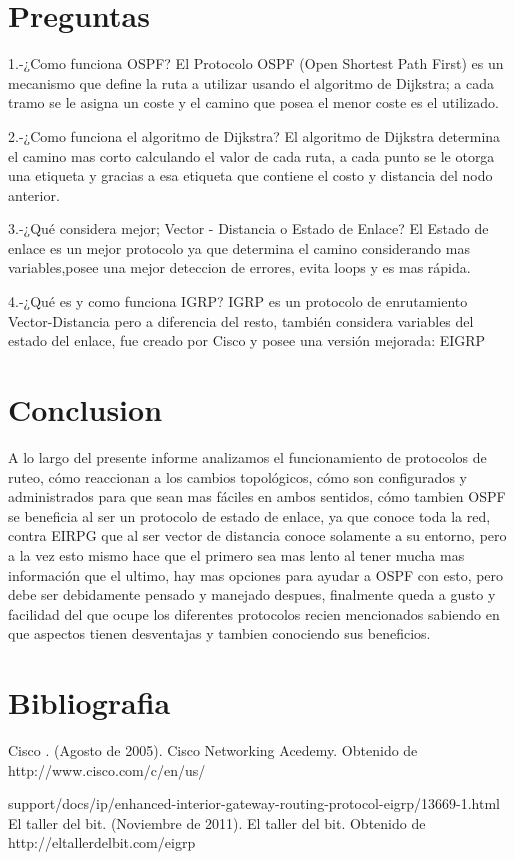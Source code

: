 \documentclass{article}
\begin{document}
\newpage

\section{Preguntas}
1.-¿Como funciona OSPF?
El Protocolo OSPF (Open Shortest Path First) es un mecanismo que define la ruta a utilizar  usando el algoritmo de Dijkstra; a cada tramo se le asigna un coste y el camino que posea el menor coste es el utilizado.

2.-¿Como funciona el algoritmo de Dijkstra?
El algoritmo de Dijkstra determina el camino mas corto calculando el valor de cada ruta, a cada punto se le otorga una etiqueta y gracias a esa etiqueta que contiene el costo y distancia del nodo anterior.

3.-¿Qué considera mejor; Vector - Distancia o Estado de Enlace?
El Estado de enlace es un mejor protocolo ya que determina el camino considerando mas variables,posee una mejor deteccion de errores, evita loops y es mas rápida.

4.-¿Qué es y como funciona IGRP?
IGRP es un protocolo de enrutamiento Vector-Distancia pero a diferencia del resto, también considera variables del estado del enlace, fue creado por Cisco y posee una versión mejorada: EIGRP


\newpage

\section{Conclusion}
A lo largo del presente informe analizamos el funcionamiento de protocolos de ruteo, cómo reaccionan a los cambios topológicos, cómo son configurados y administrados para que sean mas fáciles en ambos sentidos, cómo tambien OSPF se beneficia al ser un protocolo de estado de enlace, ya que conoce toda la red, contra EIRPG que al ser vector de distancia conoce solamente a su entorno, pero a la vez esto mismo hace que el primero sea mas lento al tener mucha mas información que el ultimo, hay mas opciones para ayudar a OSPF con esto, pero debe ser debidamente pensado y manejado despues, finalmente queda a gusto y facilidad del que ocupe los diferentes protocolos recien mencionados sabiendo en que aspectos tienen desventajas y tambien conociendo sus beneficios.

\newpage

\section{Bibliografia}

Cisco . (Agosto de 2005). Cisco Networking Acedemy. Obtenido de http://www.cisco.com/c/en/us/

support/docs/ip/enhanced-interior-gateway-routing-protocol-eigrp/13669-1.html
El taller del bit. (Noviembre de 2011). El taller del bit. Obtenido de http://eltallerdelbit.com/eigrp
\end{document}

